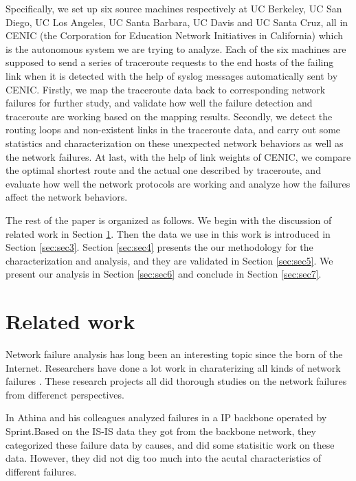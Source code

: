 \documentclass[conference, twocolumn, oneside, 10pt]{IEEEtran}
\begin{document}
Specifically, we set up six source machines respectively at UC Berkeley, UC San Diego, UC Los Angeles, UC Santa Barbara, UC Davis and UC Santa Cruz, all in CENIC (the Corporation for Education Network Initiatives in California) which is the autonomous system we are trying to analyze. Each of the six machines are supposed to send a series of traceroute requests to the end hosts of the failing link when it is detected with the help of syslog messages automatically sent by CENIC. Firstly, we map the traceroute data back to corresponding network failures for further study, and validate how well the failure detection and traceroute are working based on the mapping results. Secondly, we detect the routing loops and non-existent links in the traceroute data, and carry out some statistics and characterization on these unexpected network behaviors as well as the network failures. At last, with the help of link weights of CENIC, we compare the optimal shortest route and the actual one described by traceroute, and evaluate how well the network protocols are working and analyze how the failures affect the network behaviors.

The rest of the paper is organized as follows. We begin with the discussion of related work in Section \ref{sec:sec2}. Then the data we use in this work is introduced in Section \ref{sec:sec3}. Section \ref{sec:sec4} presents the our methodology for the characterization and analysis, and they are validated in Section \ref{sec:sec5}. We present our analysis in Section \ref{sec:sec6} and conclude in Section \ref{sec:sec7}.

\section{Related work}
\label{sec:sec2}

Network failure analysis has long been an interesting topic since the born of the Internet\cite{Baran_1964}. Researchers have done a lot work in charaterizing all kinds of network failures \cite{Chandra:2008:CFA:1453175.1453178, Gill:2011:UNF:2018436.2018477, Markopoulou:2008:CFO:1453698.1453699, Shaikh:2002:CSO:637201.637236, turner2010california}. These research projects all did thorough studies on the network failures from differenct perspectives.

In \cite{Markopoulou:2008:CFO:1453698.1453699} Athina and his colleagues analyzed failures in a IP backbone operated by Sprint.Based on the IS-IS data they got from the backbone network, they categorized these failure data by causes, and did some statisitic work on these data. However, they did not dig too much into the acutal characteristics of different failures.
\end{document}
